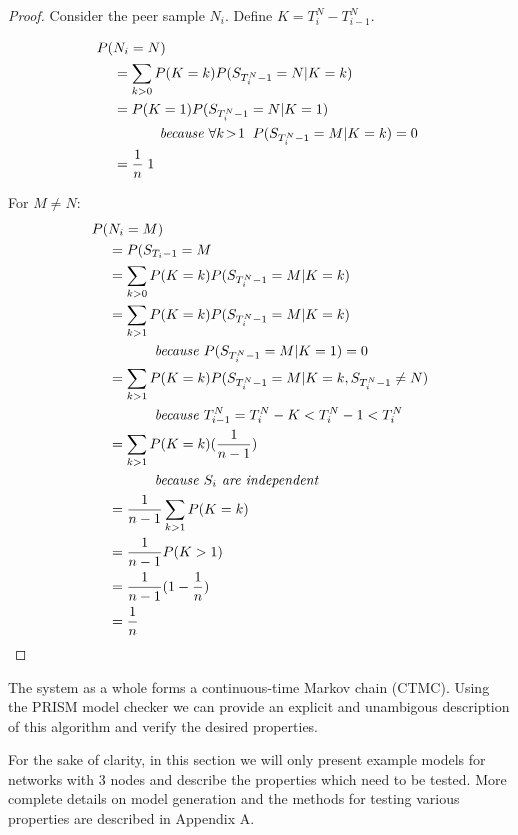 \documentclass[a4paper,10pt]{article}
\newcommand{\code}[1]{
  \footnotesize
  
}
\newcommand{\prismmodel}[1]{
  \begin{quotation}
  \code{../models/#1.sm}
  \end{quotation}
}
\newcommand{\mathins}[1]{\;\;\;\;\;\;\;\;\;\;\;\;\text{\em #1 \em}}
\begin{document}
\begin{proof}
Consider the peer sample $N_i$. Define $K = T^N_i - T^N_{i-1}$.

\begin{align*}
P(&N_i = N) \\
& = \sum_{k>0} P(K=k) P(S_{T^N_i-1}=N | K=k) \\
& = P(K=1) P(S_{T^N_i-1}=N | K=1) \\
& \mathins{ because $\forall k\!>\!1 \;\; P(S_{T^N_i-1}=M | K=k) = 0$} \\
& = \frac{1}{n} \; 1 \\
\end{align*}

\noindent For $M \neq N$: \\
\begin{align*}
P(&N_i = M) \\
& = P(S_{T_i-1} = M \\
& = \sum_{k>0} P(K=k) P(S_{T^N_i-1}=M | K=k) \\
& = \sum_{k>1} P(K=k) P(S_{T^N_i-1}=M | K=k) \\
& \mathins{ because $P(S_{T^N_i-1}=M | K=1) = 0$} \\
& = \sum_{k>1} P(K=k) P(S_{T^N_i-1}=M | K=k, S_{T^N_i-1} \neq N) \\
& \mathins{ because $T^N_{i-1} = T^N_i - K < T^N_i-1 < T^N_i$} \\
& = \sum_{k>1} P(K=k) (\frac{1}{n-1}) \\
& \mathins{ because $S_i$ are independent} \\
& = \frac{1}{n-1} \sum_{k>1} P(K=k) \\
& = \frac{1}{n-1} P(K>1) \\
& = \frac{1}{n-1} (1 - \frac{1}{n}) \\
& = \frac{1}{n} \\
\end{align*}

\end{proof}

The system as a whole forms a continuous-time Markov chain (CTMC). Using the PRISM model checker we can provide an explicit and unambigous description of this algorithm and verify the desired properties.

\prismmodel{ctmc_single}

For the sake of clarity, in this section we will only present example models for networks with 3 nodes and describe the properties which need to be tested. More complete details on model generation and the methods for testing various properties are described in Appendix A.
\end{document}
